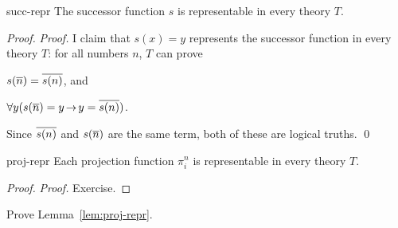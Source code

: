 
\begin{lemma}{}{succ-repr}
  The successor function $s$ is representable in every theory $T$.
\end{lemma}

\begin{proof}
  \emph{Proof.}
  I claim that
  $s(x)=y$ represents the successor function in every theory $T$:
  for all numbers $n$,
  $T$ can prove
  \begin{cenumerate}
    \item[(i)] $s(\overline{n}) = \overline{s(n)}$, and
    \item[(ii)] $\forall y(s(\num{n})=y \to y = \num{s(n)})$.
  \end{cenumerate}
  Since $\overline{s(n)}$ and $s(\overline{n})$ are the same term,
  both of these are logical truths.
  \qed
\end{proof}


\begin{lemma}{}{proj-repr}
  Each projection function $\pi^{n}_{i}$ is representable in every theory $T$.
\end{lemma}

\begin{proof}
  \emph{Proof.}
  Exercise.
\end{proof}

\begin{exercise}
  Prove Lemma~\ref{lem:proj-repr}.
\end{exercise}

